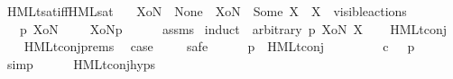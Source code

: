 \begin{isabellebody}
\begin{isamarkuptext}
\end{isamarkuptext}\isamarkuptrue%
%
\isadelimunimportant
%
\endisadelimunimportant
%
\isatagunimportant
%
\endisatagunimportant
{\isafoldunimportant}%
%
\isadelimunimportant
\isanewline
%
\endisadelimunimportant
{}\isamarkupfalse%
\ HMLt{\isacharunderscore}{\kern0pt}sat{\isacharunderscore}{\kern0pt}iff{\isacharunderscore}{\kern0pt}HML{\isacharunderscore}{\kern0pt}sat{\isacharcolon}{\kern0pt}\isanewline
\ \ \ {\isacartoucheopen}XoN\ {\isacharequal}{\kern0pt}\ None\ {\isasymor}\ {\isacharparenleft}{\kern0pt}XoN\ {\isacharequal}{\kern0pt}\ {\isacharparenleft}{\kern0pt}Some\ X{\isacharparenright}{\kern0pt}\ {\isasymand}\ X\ {\isasymsubseteq}\ visible{\isacharunderscore}{\kern0pt}actions{\isacharparenright}{\kern0pt}{\isacartoucheclose}\isanewline
\ \ \ {\isacartoucheopen}p\ {\isasymTTurnstile}{\isacharquery}{\kern0pt}{\isacharbrackleft}{\kern0pt}XoN{\isacharbrackright}{\kern0pt}\ {\isasymphi}\ \ {\isasymLongleftrightarrow}\ \ {\isasymtheta}{\isacharquery}{\kern0pt}{\isacharbrackleft}{\kern0pt}XoN{\isacharbrackright}{\kern0pt}{\isacharparenleft}{\kern0pt}p{\isacharparenright}{\kern0pt}\ {\isasymTurnstile}\ {\isasymsigma}{\isacharparenleft}{\kern0pt}{\isasymphi}{\isacharparenright}{\kern0pt}{\isacartoucheclose}\isanewline
%
\isadelimproof
\ \ %
\endisadelimproof
%
\isatagproof
{}\isamarkupfalse%
\ assms\isanewline
{}\isamarkupfalse%
\ {\isacharparenleft}{\kern0pt}induct\ {\isasymphi}\ arbitrary{\isacharcolon}{\kern0pt}\ p\ XoN\ X{\isacharparenright}{\kern0pt}\isanewline
\ \ \isamarkupfalse%
\ {\isacharparenleft}{\kern0pt}HMLt{\isacharunderscore}{\kern0pt}conj\ {\isasymPhi}{\isacharparenright}{\kern0pt}\isanewline
\ \ \isamarkupfalse%
\ HMLt{\isacharunderscore}{\kern0pt}conj{\isachardot}{\kern0pt}prems\ \isamarkupfalse%
\ {\isacharquery}{\kern0pt}case\ \isanewline
\ \ \isamarkupfalse%
\ safe\isanewline
\ \ \ \ \isamarkupfalse%
\ {\isacartoucheopen}p\ {\isasymTTurnstile}\ HMLt{\isacharunderscore}{\kern0pt}conj\ {\isasymPhi}{\isacartoucheclose}\isanewline
\ \ \ \ \isamarkupfalse%
\ {\isacartoucheopen}{\isasymforall}{\isasymphi}{\isachardot}{\kern0pt}\ {\isasymphi}\ {\isasymin}\isactrlsub c\ {\isasymPhi}\ {\isasymlongrightarrow}\ p\ {\isasymTTurnstile}\ {\isasymphi}{\isacartoucheclose}\ \isamarkupfalse%
\ simp\isanewline
\ \ \ \ \isamarkupfalse%
\ HMLt{\isacharunderscore}{\kern0pt}conj{\isachardot}{\kern0pt}hyps\ \isamarkupfalse%

\end{isabellebody}
